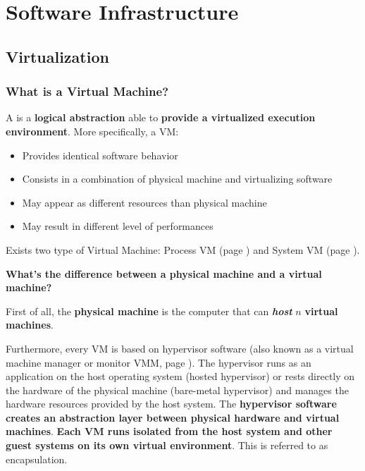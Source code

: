 \section{Software Infrastructure}

\subsection{Virtualization}

\subsubsection{What is a Virtual Machine?}

A  is a \textbf{logical abstraction} able to \textbf{provide a virtualized execution environment}. More specifically, a VM:
\begin{itemize}
    \item Provides identical software behavior
    \item Consists in a combination of physical machine and virtualizing software
    \item May appear as different resources than physical machine
    \item May result in different level of performances
\end{itemize}
Exists two type of Virtual Machine: Process VM (page \pageref{Process VM}) and System VM (page \pageref{System VM}).

\highspace
\begin{flushleft}
    \textcolor{Green3}{ \textbf{What's the difference between a physical machine and a virtual machine?}}
\end{flushleft}
First of all, the \textbf{physical machine} is the computer that can \textbf{\emph{host}} $n$ \textbf{virtual machines}. 

\highspace
Furthermore, every VM is based on hypervisor software (also known as a virtual machine manager or monitor VMM, page \pageref{subsubsection: Virtual Machine Managers (VMM)}). The hypervisor runs as an application on the host operating system (hosted hypervisor) or rests directly on the hardware of the physical machine (bare-metal hypervisor) and manages the hardware resources provided by the host system. The \textbf{hypervisor software creates an abstraction layer between physical hardware and virtual machines}. \textbf{Each VM runs isolated from the host system and other guest systems on its own virtual environment}. This is referred to as encapsulation. 

